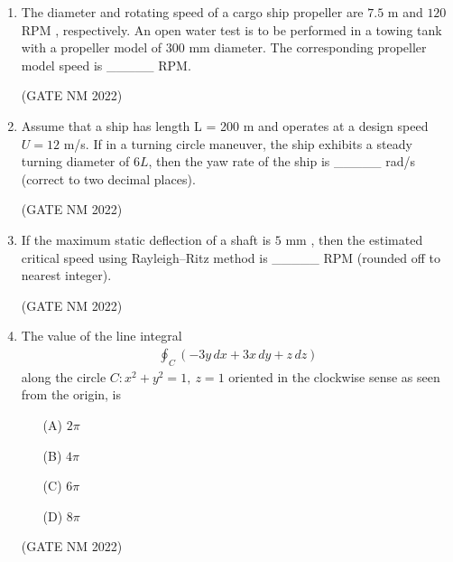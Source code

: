 \documentclass[journal,12pt,onecolumn]{IEEEtran}
\theoremstyle{remark}
\begin{document}
\begin{enumerate}
\item  The diameter and rotating speed of a cargo ship propeller are $7.5$ m  and $120$ RPM , respectively.  
An open water test is to be performed in a towing tank with a propeller model of 300 mm  diameter.  
The corresponding propeller model speed is \_\_\_\_\_ RPM.

\hfill(GATE NM 2022)
















\item  Assume that a ship has length L = 200 m  and operates at a design speed $U = 12$ m/s.  
If in a turning circle maneuver, the ship exhibits a steady turning diameter of $6L$, then the yaw rate of the ship is \_\_\_\_\_ rad/s (correct to two decimal places).

\hfill(GATE NM 2022)









\item  If the maximum static deflection of a shaft is $5$ mm , then the estimated critical speed using Rayleigh--Ritz method is \_\_\_\_\_ RPM  (rounded off to nearest integer).

	\hfill(GATE NM 2022)


\item  The value of the line integral  
\begin{align*}
\oint_C \!\left( -3y \, dx + 3x \, dy + z \, dz \right)
\end{align*}
along the circle $C: x^2 + y^2 = 1, \ z = 1$ oriented in the clockwise sense as seen from the origin, is

\begin{multicols}{4}

\begin{enumerate}
    \item[(A)] $2\pi$
    \item[(B)] $4\pi$
    \item[(C)] $6\pi$
    \item[(D)] $8\pi$
\end{enumerate}

\end{multicols}

\hfill(GATE NM 2022)








\end{enumerate}
\end{document}
